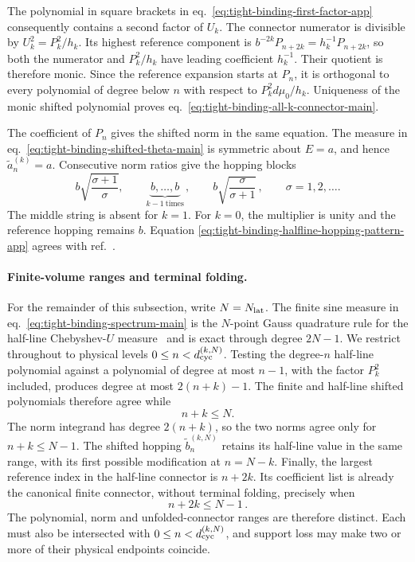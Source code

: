 \documentclass[a4paper,11pt]{article}
\def\dd{d}%
\theoremstyle{definition}
\theoremstyle{remark}
\newcommand{\dd}{\mathrm d}
\begin{document}
The polynomial in square brackets in
eq.~\eqref{eq:tight-binding-first-factor-app} consequently contains a
second factor of $U_k$.  The connector numerator is divisible by
$U_k^2=P_k^2/h_k$.  Its highest reference component is
$b^{-2k}P_{n+2k}=h_k^{-1}P_{n+2k}$, so both the numerator and
$P_k^2/h_k$ have leading coefficient $h_k^{-1}$.  Their quotient is
therefore monic.  Since
the reference expansion starts at $P_n$, it is orthogonal to every
polynomial of degree below $n$ with respect to
$P_k^2\dd\mu_0/h_k$.  Uniqueness of the monic shifted polynomial proves
eq.~\eqref{eq:tight-binding-all-k-connector-main}.

The coefficient of $P_n$ gives the shifted norm in the same equation.
The measure in eq.~\eqref{eq:tight-binding-shifted-theta-main} is
symmetric about $E=a$, and hence
$\widetilde a_n^{(k)}=a$.  Consecutive norm ratios give the hopping
blocks
\begin{equation}
   b\sqrt{\frac{\sigma+1}{\sigma}},
   \qquad
   \underbrace{b,\ldots,b}_{k-1\ \mathrm{times}}\,,
   \qquad
   b\sqrt{\frac{\sigma}{\sigma+1}}\,,
   \qquad \sigma=1,2,\ldots.
   \label{eq:tight-binding-halfline-hopping-pattern-app}
\end{equation}
The middle string is absent for $k=1$.  For $k=0$, the multiplier is
unity and the reference hopping remains $b$.  Equation
\eqref{eq:tight-binding-halfline-hopping-pattern-app} agrees with
ref.~\cite{Balasubramanian:2025variations}.

\paragraph{Finite-volume ranges and terminal folding.}
For the remainder of this subsection, write $N=N_{\rm lat}$.  The
finite sine measure in eq.~\eqref{eq:tight-binding-spectrum-main} is the
$N$-point Gauss quadrature rule for the half-line Chebyshev-$U$ measure~\cite{Gautschi2004}
and is exact through degree $2N-1$.  We restrict throughout to physical
levels $0\le n<d_{\rm cyc}^{(k,N)}$.  Testing the degree-$n$ half-line
polynomial against a polynomial of degree at most $n-1$, with the factor
$P_k^2$ included, produces degree at most $2(n+k)-1$.  The finite and
half-line shifted polynomials therefore agree while
\begin{equation}
   n+k\le N.
   \label{eq:tight-binding-finite-polynomial-range-app}
\end{equation}
The norm integrand has degree $2(n+k)$, so the two norms agree only for
$n+k\le N-1$.  The shifted hopping
$\widetilde b_n^{(k,N)}$ retains its half-line value in the same range,
with its first possible modification at $n=N-k$.  Finally, the largest
reference index in the half-line connector is $n+2k$.  Its coefficient
list is already the canonical finite connector, without terminal
folding, precisely when
\begin{equation}
   n+2k\le N-1\,.
   \label{eq:tight-binding-unfolded-connector-range-app}
\end{equation}
The polynomial, norm and unfolded-connector ranges are therefore
distinct.  Each must also be intersected with
$0\le n<d_{\rm cyc}^{(k,N)}$, and support loss may make two or more of
their physical endpoints coincide.
\end{document}
